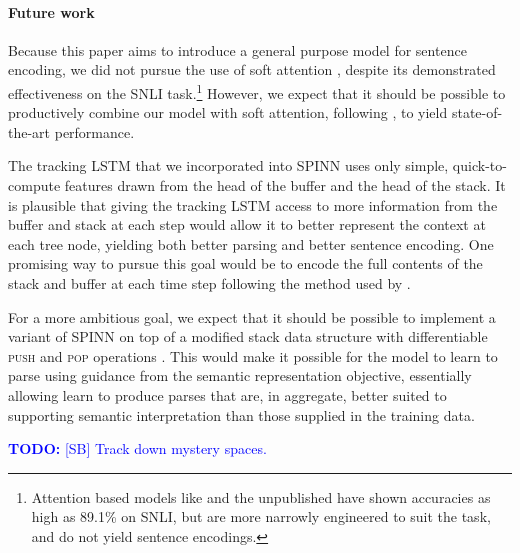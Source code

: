 \documentclass[11pt]{article}
\newcommand\todo[1]{\textcolor{blue}{\textbf{TODO:} #1}}
\begin{document}
\paragraph{Future work} Because this paper aims to introduce a general purpose model for sentence encoding, we did not pursue the use of soft attention \citep{bahdanau2014neural,rocktaschel2015reasoning}, despite its demonstrated effectiveness on the SNLI task.\footnote{Attention based models like \citet{rocktaschel2015reasoning} and the unpublished \citet{cheng2016long} have shown accuracies as high as 89.1\% on SNLI, but are more narrowly engineered to suit the task, and do not yield sentence encodings.} However, we expect that it should be possible to productively combine our model with soft attention, following \citet{cheng2016long}, to yield state-of-the-art performance.

The tracking LSTM that we incorporated into SPINN uses only simple, quick-to-compute features drawn from the head of the buffer and the head of the stack. It is plausible that giving the tracking LSTM access to more information from the buffer and stack at each step would allow it to better represent the context at each tree node, yielding both better parsing and better sentence encoding. One promising way to pursue this goal would be to encode the full contents of the stack and buffer at each time step following the method used by \citet{dyer-EtAl:2015:ACL-IJCNLP}.

For a more ambitious goal, we expect that it should be possible to implement a variant of SPINN on top of a modified stack data structure with differentiable \textsc{push} and \textsc{pop} operations \citep[as in][]{grefenstette2015learning,joulin2015inferring}. This would make it possible for the model to learn to parse using guidance from the semantic representation objective, essentially allowing learn to produce parses that are, in aggregate, better suited to supporting semantic interpretation than those supplied in the training data. 

%    
 


 
\todo{[SB] Track down mystery spaces.}
\end{document}
